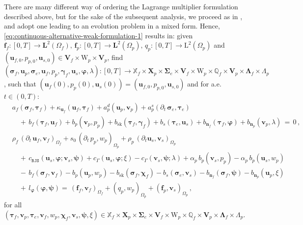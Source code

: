\documentclass[11pt]{article}
\numberwithin{equation}{section}
\newcommand{\bgamma}{{\boldsymbol\gamma}}
\newcommand{\bLambda}{{\boldsymbol\Lambda}}
\newcommand{\bsi}{{\boldsymbol\sigma}}
\newcommand{\bSigma}{{\boldsymbol\Sigma}}
\newcommand{\bvarphi}{{\boldsymbol\varphi}}
\newcommand{\bpsi}{{\boldsymbol\psi}}
\newcommand{\btau}{{\boldsymbol\tau}}
\newcommand{\bchi}{{\boldsymbol\chi}}
\newcommand{\bv}{{\mathbf{v}}}
\newcommand{\f}{\mathbf{f}}
\newcommand{\bu}{\mathbf{u}}
\newcommand{\bn}{{\mathbf{n}}}
\newcommand{\0}{{\mathbf{0}}}
\def\bX{\mathbf{X}}
\def\bV{\mathbf{V}}
\newcommand{\bL}{\mathbf{L}}
\newcommand\bbQ{\mathbb{Q}}
\newcommand\bbX{\mathbb{X}}
\def\L{\mathrm{L}}
\def\W{\mathrm{W}}
\def\BJS{\mathtt{BJS}}
\def\sk{\mathrm{sk}}
\numberwithin{equation}{section}
\begin{document}
There are many different way of ordering the Lagrange multiplier formulation described above, but for the sake of the subsequent analysis, we proceed as in \cite{aeny2019}, and adopt one leading to an evolution problem in a mixed form. Hence, \eqref{eq:continuous-alternative-weak-formulation-1} results in:
given $\f_f:[0,T]\to \bL^2(\Omega_f),\, \f_p : [0,T]\to \bL^2(\Omega_p),\, q_p:[0,T]\to \L^2(\Omega_p)$ and $(\bu_{f,0},p_{p,0},\bu_{s,0})\in \bV_f\times \W_p\times \bV_p$,
find $(\bsi_f, \bu_p, \bsi_e, \bu_f, p_p, \bgamma_f, \bu_s, \bvarphi, \lambda) : [0,T]\to \bbX_f\times \bX_p\times \bSigma_e\times \bV_f\times \W_p\times \bbQ_f\times \bV_p\times \bLambda_f\times \Lambda_p$, such that $(\bu_f(0),p_p(0),\bu_s(0)) = (\bu_{f,0},p_{p,0},\bu_{s,0})$ and for a.e. $t\in (0,T)$:
\begin{align}
& a_f(\bsi_f,\btau_f) + \kappa_{\bu_f}(\bu_f, \btau_f) + a^d_p(\bu_p,\bv_p) + a^s_p(\partial_t\,\bsi_e,\btau_e) \nonumber \\[0.5ex] 
&\quad +\, b_f(\btau_f,\bu_f) + b_p(\bv_p,p_p) + b_\sk(\btau_f,\bgamma_f)
+ b_s(\btau_e,\bu_s) + b_{\bn_f}(\btau_f,\bvarphi) + b_{\bn_p}(\bv_p,\lambda)  \,=\, 0 \,,  \nonumber \\[0.5ex] 
& \rho_f\,(\partial_t\,\bu_f,\bv_f)_{\Omega_f} + s_0\,(\partial_t\,p_p,w_p)_{\Omega_p}
+ \rho_p\,(\partial_t\bu_s,\bv_s)_{\Omega_p}  \nonumber \\[0.5ex] 
&\quad +\, c_{\BJS}(\bu_s,\bvarphi;\bv_s,\bpsi) + c_{\Gamma}(\bu_s,\bvarphi;\xi) - c_{\Gamma}(\bv_s,\bpsi;\lambda) 
+ \alpha_p\,b_p(\bv_s,p_p) - \alpha_p\,b_p(\bu_s,w_p)  \nonumber \\[0.5ex] 
&\quad -\, b_f(\bsi_f,\bv_f) - b_p(\bu_p,w_p) - b_\sk(\bsi_f,\bchi_f)  
- b_s(\bsi_e,\bv_s) - b_{\bn_f}(\bsi_f,\bpsi) - b_{\bn_p}(\bu_p,\xi) \nonumber \\[0.5ex] 
&\quad +\, l_{\bvarphi}(\bvarphi,\bpsi) =\, (\f_f,\bv_f)_{\Omega_f} +(q_p,w_p)_{\Omega_p} + (\f_p,\bv_s)_{\Omega_p}\,, \label{eq:NS-Biot-formulation-2}
\end{align}
for all $(\btau_f, \bv_p, \btau_e, \bv_f, w_p, \bchi_f, \bv_s, \bpsi, \xi)\in \bbX_f\times \bX_p\times \bSigma_e\times \bV_f\times \W_p\times \bbQ_f\times \bV_p\times \bLambda_f\times \Lambda_p$. 


\medskip
\end{document}
